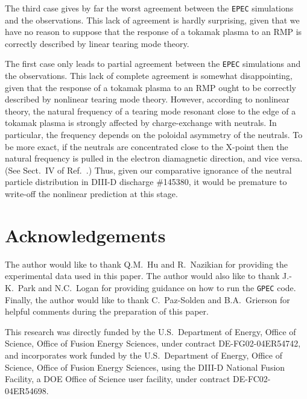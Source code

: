 \documentclass[12pt,prb,aps]{revtex4-1}
\begin{document}
 The third case gives by far the worst agreement between the {\tt EPEC} simulations and the  observations. This lack of agreement is hardly surprising, given
that we have no reason to suppose that the response of a tokamak plasma to an RMP is correctly described by linear tearing mode theory.\cite{rf1} 

The first case only leads to partial agreement between  the {\tt EPEC} simulations and the  observations. This lack of complete agreement is somewhat
disappointing, given that the response of a tokamak plasma to an RMP ought to be correctly described by nonlinear tearing mode theory. However, according to
nonlinear theory, the natural frequency of a tearing mode resonant close to the edge of a tokamak plasma is strongly affected by charge-exchange with neutrals.\cite{rf2}
In particular, the frequency depends on the poloidal asymmetry of the neutrals. To be more exact, if the neutrals are concentrated close to the X-point then the
natural frequency is pulled in the electron diamagnetic direction, and vice versa.\cite{rf2} (See Sect.~IV of Ref.~.) Thus, given our comparative ignorance of the neutral particle
distribution in DIII-D discharge \#145380, it would be premature to write-off the nonlinear prediction at this stage.  

\section*{Acknowledgements}
The author would like to thank Q.M.~Hu and R.~Nazikian for providing the experimental data used in this paper. The
author would also like to thank J.-K.~Park and N.C.~Logan for providing guidance on how to run the {\tt GPEC} code. Finally, the
author would like to thank C.~Paz-Solden and B.A.~Grierson for helpful comments during the preparation of this paper. 

This research was directly funded by the U.S.\ Department of Energy, Office of Science, Office of Fusion Energy Sciences,  under contract DE-FG02-04ER54742, and
incorporates work funded by the U.S.\ Department of Energy, Office of Science, Office of Fusion Energy Sciences, using the DIII-D National Fusion Facility, a DOE Office of Science user facility, under contract DE-FC02-04ER54698.  
\end{document}
